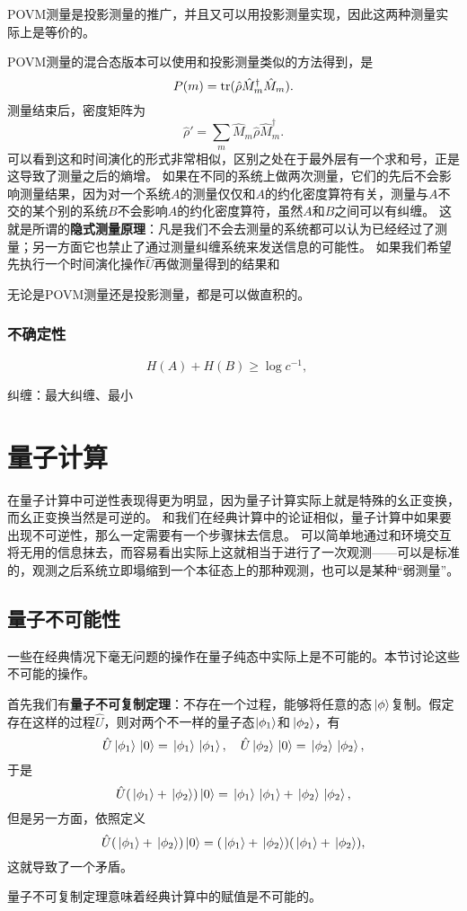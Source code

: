 \documentclass[UTF8, a4paper]{ctexart}
\begin{document}
POVM测量是投影测量的推广，并且又可以用投影测量实现，因此这两种测量实际上是等价的。

POVM测量的混合态版本可以使用和投影测量类似的方法得到，是
\begin{equation}
    P(m) = \trace(\hat{\rho} \hat{M}^\dagger_m \hat{M}_m).
\end{equation}
测量结束后，密度矩阵为
\begin{equation}
    \hat{\rho}' = \sum_m \hat{M}_m \hat{\rho} \hat{M}_m^\dagger.
\end{equation}
可以看到这和时间演化的形式非常相似，区别之处在于最外层有一个求和号，正是这导致了测量之后的熵增。
如果在不同的系统上做两次测量，它们的先后不会影响测量结果，因为对一个系统$A$的测量仅仅和$A$的约化密度算符有关，测量与$A$不交的某个别的系统$B$不会影响$A$的约化密度算符，虽然$A$和$B$之间可以有纠缠。
这就是所谓的\textbf{隐式测量原理}：凡是我们不会去测量的系统都可以认为已经经过了测量；另一方面它也禁止了通过测量纠缠系统来发送信息的可能性。
如果我们希望先执行一个时间演化操作$\hat{U}$再做测量得到的结果和

无论是POVM测量还是投影测量，都是可以做直积的。

\subsubsection{不确定性}

\begin{equation}
    H(A) + H(B) \geq \log c^{-1}, \quad 
\end{equation}

纠缠：最大纠缠、最小

\section{量子计算}

在量子计算中可逆性表现得更为明显，因为量子计算实际上就是特殊的幺正变换，而幺正变换当然是可逆的。
和我们在经典计算中的论证相似，量子计算中如果要出现不可逆性，那么一定需要有一个步骤抹去信息。
可以简单地通过和环境交互将无用的信息抹去，而容易看出实际上这就相当于进行了一次观测——可以是标准的，观测之后系统立即塌缩到一个本征态上的那种观测，也可以是某种“弱测量”。

\subsection{量子不可能性}

一些在经典情况下毫无问题的操作在量子纯态中实际上是不可能的。本节讨论这些不可能的操作。

首先我们有\textbf{量子不可复制定理}：不存在一个过程，能够将任意的态$\ket*{\phi}$复制。假定存在这样的过程$\hat{U}$，则对两个不一样的量子态$\ket{\phi_1}$和$\ket*{\phi_2}$，有
\[
    \hat{U} \ket*{\phi_1} \ket*{0} = \ket*{\phi_1} \ket*{\phi_1}, \quad \hat{U} \ket*{\phi_2} \ket*{0} = \ket*{\phi_2} \ket*{\phi_2} ,
\]
于是
\[
    \hat{U} (\ket*{\phi_1} + \ket*{\phi_2}) \ket*{0} = \ket*{\phi_1} \ket*{\phi_1} + \ket*{\phi_2} \ket*{\phi_2},
\]
但是另一方面，依照定义
\[
    \hat{U} (\ket*{\phi_1} + \ket*{\phi_2}) \ket*{0} = (\ket*{\phi_1} + \ket*{\phi_2}) (\ket*{\phi_1} + \ket*{\phi_2}),
\]
这就导致了一个矛盾。

量子不可复制定理意味着经典计算中的赋值是不可能的。
\end{document}
